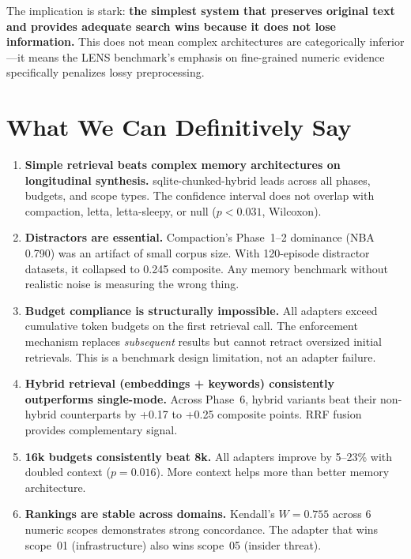 \documentclass[11pt,letterpaper]{article}
\begin{document}
The implication is stark: \textbf{the simplest system that preserves original text and provides adequate search wins because it does not lose information.} This does not mean complex architectures are categorically inferior---it means the LENS benchmark's emphasis on fine-grained numeric evidence specifically penalizes lossy preprocessing.

\section{What We Can Definitively Say}
\label{sec:definitive}

\begin{enumerate}
  \item \textbf{Simple retrieval beats complex memory architectures on longitudinal synthesis.} sqlite-chunked-hybrid leads across all phases, budgets, and scope types. The confidence interval does not overlap with compaction, letta, letta-sleepy, or null ($p < 0.031$, Wilcoxon).

  \item \textbf{Distractors are essential.} Compaction's Phase~1--2 dominance (NBA 0.790) was an artifact of small corpus size. With 120-episode distractor datasets, it collapsed to 0.245 composite. Any memory benchmark without realistic noise is measuring the wrong thing.

  \item \textbf{Budget compliance is structurally impossible.} All adapters exceed cumulative token budgets on the first retrieval call. The enforcement mechanism replaces \emph{subsequent} results but cannot retract oversized initial retrievals. This is a benchmark design limitation, not an adapter failure.

  \item \textbf{Hybrid retrieval (embeddings + keywords) consistently outperforms single-mode.} Across Phase~6, hybrid variants beat their non-hybrid counterparts by +0.17 to +0.25 composite points. RRF fusion provides complementary signal.

  \item \textbf{16k budgets consistently beat 8k.} All adapters improve by 5--23\% with doubled context ($p = 0.016$). More context helps more than better memory architecture.

  \item \textbf{Rankings are stable across domains.} Kendall's $W = 0.755$ across 6 numeric scopes demonstrates strong concordance. The adapter that wins scope~01 (infrastructure) also wins scope~05 (insider threat).


\end{enumerate}
\end{document}
